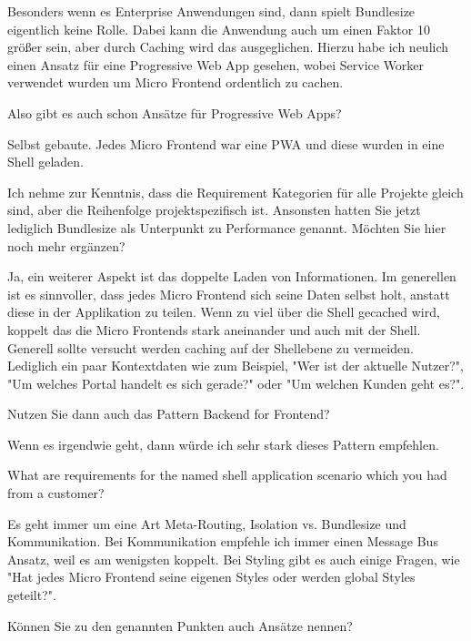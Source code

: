 \begin{description}
    \ManfredSteyer Besonders wenn es Enterprise Anwendungen sind, dann spielt Bundlesize eigentlich keine Rolle. Dabei kann die Anwendung auch um einen Faktor 10 größer sein, aber durch Caching wird das ausgeglichen. Hierzu habe ich neulich einen Ansatz für eine Progressive Web App gesehen, wobei Service Worker verwendet wurden um Micro Frontend ordentlich zu cachen.

    \NicoVogel Also gibt es auch schon Ansätze für Progressive Web Apps?

    \ManfredSteyer Selbst gebaute. Jedes Micro Frontend war eine PWA und diese wurden in eine Shell geladen.

    \NicoVogel Ich nehme zur Kenntnis, dass die Requirement Kategorien für alle Projekte gleich sind, aber die Reihenfolge projektspezifisch ist. Ansonsten hatten Sie jetzt lediglich Bundlesize als Unterpunkt zu Performance genannt. Möchten Sie hier noch mehr ergänzen?

    \ManfredSteyer Ja, ein weiterer Aspekt ist das doppelte Laden von Informationen. Im generellen ist es sinnvoller, dass jedes Micro Frontend sich seine Daten selbst holt, anstatt diese in der Applikation zu teilen. Wenn zu viel über die Shell gecached wird, koppelt das die Micro Frontends stark aneinander und auch mit der Shell. Generell sollte versucht werden caching auf der Shellebene zu vermeiden. Lediglich ein paar Kontextdaten wie zum Beispiel, "Wer ist der aktuelle Nutzer?", "Um welches Portal handelt es sich gerade?" oder "Um welchen Kunden geht es?".

    \NicoVogel Nutzen Sie dann auch das Pattern Backend for Frontend?

    \ManfredSteyer Wenn es irgendwie geht, dann würde ich sehr stark dieses Pattern empfehlen.

    \NicoVogel What are requirements for the named shell application scenario which you had from a customer?


    \ManfredSteyer Es geht immer um eine Art Meta-Routing, Isolation vs. Bundlesize und Kommunikation. Bei Kommunikation empfehle ich immer einen Message Bus Ansatz, weil es am wenigsten koppelt. Bei Styling gibt es auch einige Fragen, wie "Hat jedes Micro Frontend seine eigenen Styles oder werden global Styles geteilt?".


    \NicoVogel Können Sie zu den genannten Punkten auch Ansätze nennen?



\end{description}
